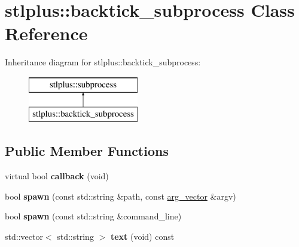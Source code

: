 \hypertarget{classstlplus_1_1backtick__subprocess}{}\section{stlplus\+:\+:backtick\+\_\+subprocess Class Reference}
\label{classstlplus_1_1backtick__subprocess}
Inheritance diagram for stlplus\+:\+:backtick\+\_\+subprocess\+:\begin{figure}[H]
\begin{center}
\leavevmode
\includegraphics[height=2.000000cm]{classstlplus_1_1backtick__subprocess}
\end{center}
\end{figure}
\subsection*{Public Member Functions}
\begin{DoxyCompactItemize}
\item 
virtual bool {\bfseries callback} (void)\hypertarget{classstlplus_1_1backtick__subprocess_a760f58f5154a49e66a009366d4e55ebd}{}\label{classstlplus_1_1backtick__subprocess_a760f58f5154a49e66a009366d4e55ebd}

\item 
bool {\bfseries spawn} (const std\+::string \&path, const \hyperlink{classstlplus_1_1arg__vector}{arg\+\_\+vector} \&argv)\hypertarget{classstlplus_1_1backtick__subprocess_a2a9822403aef74b1cc6db689c7578c36}{}\label{classstlplus_1_1backtick__subprocess_a2a9822403aef74b1cc6db689c7578c36}

\item 
bool {\bfseries spawn} (const std\+::string \&command\+\_\+line)\hypertarget{classstlplus_1_1backtick__subprocess_a7339316320d8859e839e9c8175c61464}{}\label{classstlplus_1_1backtick__subprocess_a7339316320d8859e839e9c8175c61464}

\item 
std\+::vector$<$ std\+::string $>$ {\bfseries text} (void) const \hypertarget{classstlplus_1_1backtick__subprocess_abb41c0f2dbd63bfa93c528468c62a0fa}{}\label{classstlplus_1_1backtick__subprocess_abb41c0f2dbd63bfa93c528468c62a0fa}

\end{DoxyCompactItemize}
